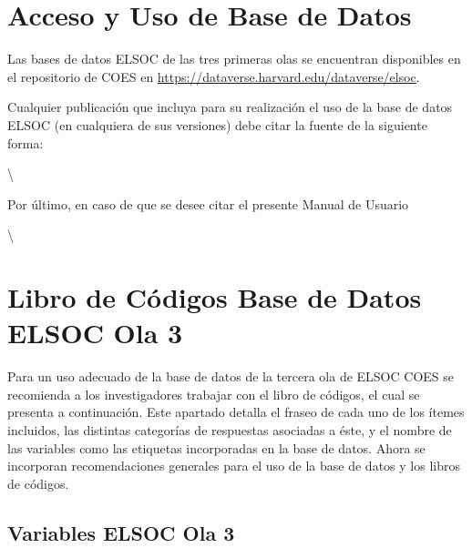 \documentclass[
  openany]{book}
\begin{document}
\hypertarget{acceso_datos}{%
\chapter{Acceso y Uso de Base de Datos}\label{acceso_datos}}

Las bases de datos ELSOC de las tres primeras olas se encuentran disponibles en el repositorio de COES en \url{https://dataverse.harvard.edu/dataverse/elsoc}.

Cualquier publicación que incluya para su realización el uso de la base de datos ELSOC (en cualquiera de sus versiones) debe citar la fuente de la siguiente forma:

\noindent {}\textbackslash{}

Por último, en caso de que se desee citar el presente Manual de Usuario

\noindent {}\textbackslash{}

\hypertarget{libro_codigos}{%
\chapter{Libro de Códigos Base de Datos ELSOC Ola 3}\label{libro_codigos}}

Para un uso adecuado de la base de datos de la tercera ola de ELSOC COES se recomienda a los investigadores trabajar con el libro de códigos, el cual se presenta a continuación. Este apartado detalla el fraseo de cada uno de los ítemes incluidos, las distintas categorías de respuestas asociadas a éste, y el nombre de las variables como las etiquetas incorporadas en la base de datos. Ahora se incorporan recomendaciones generales para el uso de la base de datos y los libros de códigos.

\hypertarget{variables-elsoc-ola-3}{%
\section{Variables ELSOC Ola 3}\label{variables-elsoc-ola-3}}
\end{document}
